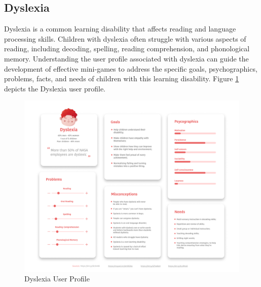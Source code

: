 \subsection{Dyslexia}
Dyslexia is a common learning disability that affects reading and language processing skills. Children with dyslexia often struggle with various aspects of reading, including decoding, spelling, reading comprehension, and phonological memory. Understanding the user profile associated with dyslexia can guide the development of effective mini-games to address the specific goals, psychographics, problems, facts, and needs of children with this learning disability. Figure \ref{fig:dyslexiaUserProfile} depicts the Dyslexia user profile.

\begin{figure}[H]
    \centering
    \includegraphics[width=1\linewidth]{Chapters/figma/Dislexia.png}
    \caption{Dyslexia User Profile}
    \label{fig:dyslexiaUserProfile}
\end{figure}

